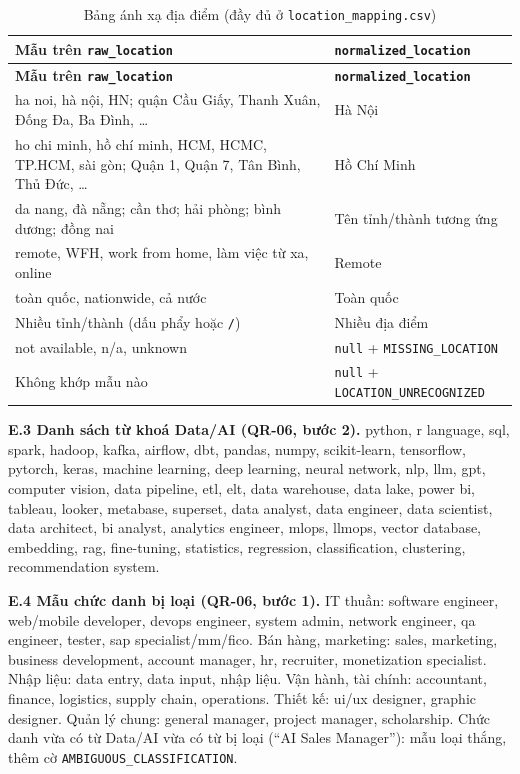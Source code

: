 \documentclass[12pt]{article}
\newcommand{\code}[1]{\texttt{#1}}
\begin{document}
\begin{longtable}{>{\raggedright\arraybackslash}p{9.6cm} >{\raggedright\arraybackslash}p{5cm}}
\caption{Bảng ánh xạ địa điểm (đầy đủ ở \code{location\_mapping.csv})}\label{tab:location}\\
\toprule
\textbf{Mẫu trên \code{raw\_location}} & \textbf{\code{normalized\_location}} \\
\midrule
\endfirsthead
\toprule
\textbf{Mẫu trên \code{raw\_location}} & \textbf{\code{normalized\_location}} \\
\midrule
\endhead
ha noi, hà nội, HN; quận Cầu Giấy, Thanh Xuân, Đống Đa, Ba Đình, \dots & Hà Nội \\
ho chi minh, hồ chí minh, HCM, HCMC, TP.HCM, sài gòn; Quận 1, Quận 7, Tân Bình, Thủ Đức, \dots & Hồ Chí Minh \\
da nang, đà nẵng; cần thơ; hải phòng; bình dương; đồng nai & Tên tỉnh/thành tương ứng \\
remote, WFH, work from home, làm việc từ xa, online & Remote \\
toàn quốc, nationwide, cả nước & Toàn quốc \\
Nhiều tỉnh/thành (dấu phẩy hoặc \code{/}) & Nhiều địa điểm \\
not available, n/a, unknown & \code{null} + \code{MISSING\_LOCATION} \\
Không khớp mẫu nào & \code{null} + \code{LOCATION\_UNRECOGNIZED} \\
\bottomrule
\end{longtable}

\textbf{E.3 Danh sách từ khoá Data/AI (QR-06, bước 2).} python, r language, sql, spark, hadoop, kafka, airflow, dbt, pandas, numpy, scikit-learn, tensorflow, pytorch, keras, machine learning, deep learning, neural network, nlp, llm, gpt, computer vision, data pipeline, etl, elt, data warehouse, data lake, power bi, tableau, looker, metabase, superset, data analyst, data engineer, data scientist, data architect, bi analyst, analytics engineer, mlops, llmops, vector database, embedding, rag, fine-tuning, statistics, regression, classification, clustering, recommendation system.

\textbf{E.4 Mẫu chức danh bị loại (QR-06, bước 1).} IT thuần: software engineer, web/mobile developer, devops engineer, system admin, network engineer, qa engineer, tester, sap specialist/mm/fico. Bán hàng, marketing: sales, marketing, business development, account manager, hr, recruiter, monetization specialist. Nhập liệu: data entry, data input, nhập liệu. Vận hành, tài chính: accountant, finance, logistics, supply chain, operations. Thiết kế: ui/ux designer, graphic designer. Quản lý chung: general manager, project manager, scholarship. Chức danh vừa có từ Data/AI vừa có từ bị loại (``AI Sales Manager''): mẫu loại thắng, thêm cờ \code{AMBIGUOUS\_CLASSIFICATION}.
\end{document}
